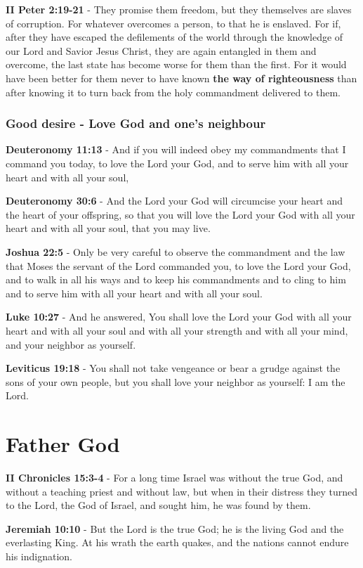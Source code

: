 \documentclass[11pt]{article}
\begin{document}
\textbf{II Peter 2:19-21} - They promise them freedom, but they themselves are slaves of corruption. For whatever overcomes a person, to that he is enslaved. For if, after they have escaped the defilements of the world through the knowledge of our Lord and Savior Jesus Christ, they are again entangled in them and overcome, the last state has become worse for them than the first. For it would have been better for them never to have known \textbf{the way of righteousness} than after knowing it to turn back from the holy commandment delivered to them.

\subsubsection{Good desire - Love God and one's neighbour}
\label{sec:orgfb5d8b3}
\textbf{Deuteronomy 11:13} - And if you will indeed obey my commandments that I command you today, to love the Lord your God, and to serve him with all your heart and with all your soul,

\textbf{Deuteronomy 30:6} - And the Lord your God will circumcise your heart and the heart of your offspring, so that you will love the Lord your God with all your heart and with all your soul, that you may live.

\textbf{Joshua 22:5} - Only be very careful to observe the commandment and the law that Moses the servant of the Lord commanded you, to love the Lord your God, and to walk in all his ways and to keep his commandments and to cling to him and to serve him with all your heart and with all your soul.

\textbf{Luke 10:27} - And he answered, You shall love the Lord your God with all your heart and with all your soul and with all your strength and with all your mind, and your neighbor as yourself.

\textbf{Leviticus 19:18} - You shall not take vengeance or bear a grudge against the sons of your own people, but you shall love your neighbor as yourself: I am the Lord.

\section{Father God}
\label{sec:org1b8f2f6}
\textbf{II Chronicles 15:3-4} - For a long time Israel was without the true God, and without a teaching priest and without law, but when in their distress they turned to the Lord, the God of Israel, and sought him, he was found by them.

\textbf{Jeremiah 10:10} - But the Lord is the true God; he is the living God and the everlasting King. At his wrath the earth quakes, and the nations cannot endure his indignation.
\end{document}
